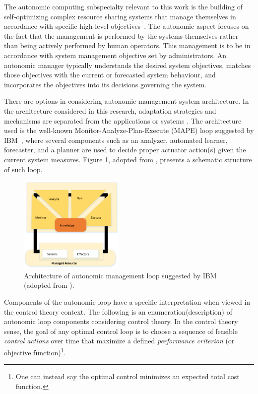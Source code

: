  The autonomic computing subspecialty relevant to this work is the building of self-optimizing complex resource sharing systems that manage themselves in accordance with specific high-level objectives~\cite{kephart_vision_2003}. The autonomic aspect focuses on the fact that the management is performed by the systems themselves rather than being actively performed by human operators. This management is to be in accordance with system management objective set by administrators. An autonomic manager typically understands the desired system objectives, matches those objectives with the current or forecasted system behaviour, and incorporates the objectives into its decisions governing the system. 

  There are options in considering autonomic management system architecture.
 In the architecture considered in this research, adaptation strategies and mechanisms are separated from the applications or systems \cite{garlan2004rainbow, tesauro_utility_2004}. 
The architecture used is the well-known Monitor-Analyze-Plan-Execute (MAPE)  loop suggested by IBM~\cite{computing2005architectural}, where several components such as an analyzer, automated learner, forecaster, and a planner are used to decide proper actuator action(s) given the current system measures. Figure \ref{fig:mapeloop}, adopted from \cite{mape-loop-pic}, presents a schematic structure of such loop.
\begin{figure}[h]
	\centering		
	\includegraphics[width=0.45\textwidth]{image/mapeloop1.eps} 
	\caption[Architecture of autonomic management loop.]{Architecture of autonomic management loop suggested by IBM (adopted from \cite{mape-loop-pic}).} 
	\label{fig:mapeloop}
\end{figure}
  
 Components of the autonomic loop have a specific interpretation when viewed in the control theory context. 
 The following is an enumeration(description) of autonomic loop components  considering control theory.
 In the control theory sense, the goal of any optimal control loop is to choose a sequence of feasible \textit{control actions} over time that maximize a defined \textit{performance criterion} (or objective function)\footnote{One can instead say the optimal control minimizes an expected total cost function.}.


